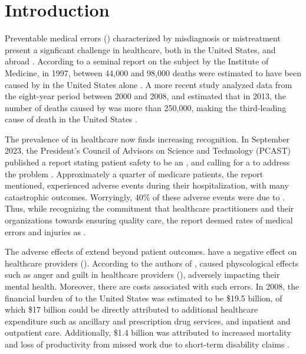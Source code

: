 \chapter{Introduction}

Preventable medical errors (\PMEs{}) characterized by misdiagnosis or mistreatment present
a signficant challenge in healthcare, both in the United States, and abroad \cite{RodziewiczStatsPearls18}.
According to a seminal report on the subject by the Institute of Medicine, in 1997,
between 44,000 and 98,000 deaths were estimated to have been caused by \PMEs{} in
the United States alone \cite{DonaldsonBook00}.
A more recent study analyzed data from the eight-year
period between 2000 and 2008, and estimated that in 2013, the number of deaths
caused by \PMEs{} was more than 250,000, making \PMEs{} the third-leading
cause of death in the United States \cite{MakaryBMJ16}.

The prevalence of \PMEs{} in healthcare now finds increasing recognition.
In September 2023, the President's Council of Advisors on Science and
Technology (PCAST) published a report stating
patient safety to be an , and calling
for a  to address the problem \cite{PCAST23}.
Approximately a quarter of medicare
patients, the report mentioned, experienced adverse events during their hospitalization, with
many catastrophic outcomes. Worryingly, 40\% of these adverse events were
due to \PMEs{}. Thus, while recognizing the commitment that
healthcare practitioners and their organizations towards ensuring quality
care, the report deemed rates of medical errors and injuries as .

The adverse effects of \PMEs{} extend beyond patient outcomes.
\PMEs{} have a negative effect on healthcare providers (\HCPs). According to the authors of
\cite{RodziewiczStatsPearls18}, \PMEs{} caused physcological effects such
as anger and guilt in healthcare providers (\HCPs{}), adversely impacting their mental
health. Moreover, there are costs associated with such errors.
In 2008, the financial burden of \PMEs{} to the United States was
estimated to be \$19.5 billion, of which \$17 billion could be
directly attributed to additional healthcare expenditure such as
ancillary and prescription drug services, and inpatient and outpatient care.
Additionally, \$1.4 billion was attributed to increased mortality and loss
of productivity from missed work due to short-term disability claims \cite{AndelJHCF12}.

